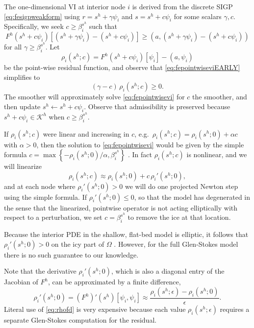 \documentclass[letterpaper,final,12pt,reqno]{amsart}
\theoremstyle{claim}
\newcommand{\eps}{\epsilon}
\newcommand{\ip}[2]{\left(#1,#2\right)}
\numberwithin{equation}{section}
\numberwithin{figure}{section}
\numberwithin{table}{section}
\numberwithin{theorem}{section}
\begin{document}
The one-dimensional VI at interior node $i$ is derived from the discrete SIGP \eqref{eq:fesigpweakform} using $r = s^h+\gamma \psi_i$ and $s = s^h+c \psi_i$ for some scalars $\gamma,c$.  Specifically, we seek $c \ge \beta_i^{s^h}$ such that
\begin{equation}
F^h(s^h+c \psi_i)[(s^h+\gamma \psi_i) - (s^h+c \psi_i)] \ge \ip{a}{(s^h+\gamma \psi_i) - (s^h+c \psi_i)} \label{eq:fepointwiseviEARLY}
\end{equation}
for all $\gamma \ge \beta_i^{s^h}$.  Let
\begin{equation}
\rho_i(s^h; c) = F^h(s^h+c\psi_i)[\psi_i] - \ip{a}{\psi_i} \label{eq:ferhoi}
\end{equation}
be the point-wise residual function, and observe that \eqref{eq:fepointwiseviEARLY} simplifies to
\begin{equation}
(\gamma - c) \,\rho_i(s^h; c) \ge 0. \label{eq:fepointwisevi}
\end{equation}
The smoother will approximately solve \eqref{eq:fepointwisevi} for $c$ the smoother, and then update $s^h \gets s^h + c \psi_i$.  Observe that admissibility is preserved because $s^h+c \psi_i \in \mathcal{K}^h$ when $c \ge \beta_i^{s^h}$.

If $\rho_i(s^h; c)$ were linear and increasing in $c$, e.g.~$\rho_i(s^h; c) = \rho_i(s^h; 0) + \alpha c$ with $\alpha > 0$, then the solution to \eqref{eq:fepointwisevi} would be given by the simple formula $c = \max\left\{-\rho_i(s^h; 0)/\alpha, \beta_i^{s^h}\right\}$ \cite{GraeserKornhuber2009}.  In fact $\rho_i(s^h; c)$ is nonlinear, and we will linearize
\begin{equation}
\rho_i(s^h; c) \approx \rho_i(s^h; 0) + c\, \rho_i'(s^h; 0), \label{eq:rhoapprox}
\end{equation}
and at each node where $\rho_i'(s^h; 0) > 0$ we will do one projected Newton step using the simple formula.  If $\rho_i'(s^h; 0) \le 0$, so that the model has degenerated in the sense that the linearized, pointwise operator is not acting elliptically with respect to a perturbation, we set $c = \beta_i^{s^h}$ to remove the ice at that location.  %

Because the interior PDE in the shallow, flat-bed model is elliptic, it follows that $\rho_i'(s^h; 0) > 0$ on the icy part of $\Omega$ \cite{JouvetBueler2012}.  However, for the full Glen-Stokes model there is no such guarantee to our knowledge.

Note that the derivative $\rho_i'(s^h; 0)$, which is also a diagonal entry of the Jacobian of $F^h$, can be approximated by a finite difference,
\begin{equation}
\rho_i'(s^h; 0) = (F^h)'(s^h)[\psi_i,\psi_i] \approx \frac{\rho_i(s^h; \eps) - \rho_i(s^h; 0)}{\eps}.  \label{eq:rhofd}
\end{equation}
Literal use of \eqref{eq:rhofd} is very expensive because each value $\rho_i(s^h; \eps)$ requires a separate Glen-Stokes computation for the residual.
\end{document}
